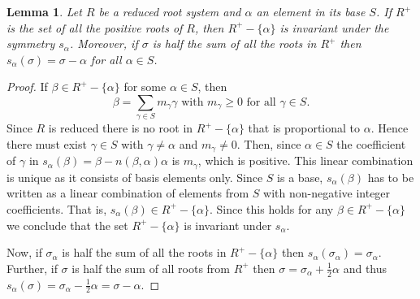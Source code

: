 \documentclass[twoside,utf8]{article}
\theoremstyle{plain}
\newtheorem{lemma}{Lemma}
\theoremstyle{definition}
\theoremstyle{remark}
\begin{document}
\begin{lemma} \label{lemma:HalfTheSum}
Let $R$ be a reduced root system and $\alpha$ an element in its base $S$. If $R^+$ is the set of all the positive roots of $R$, then $R^+-\{\alpha\}$ is invariant under the symmetry $s_\alpha$. Moreover, if $\sigma$ is half the sum of all the roots in $R^+$ then $s_\alpha(\sigma)=\sigma-\alpha$ for all $\alpha \in S$.
\end{lemma}
\begin{proof}
If $\beta \in R^+-\{\alpha\}$ for some $\alpha\in S$, then 
\[
\beta = \sum_{\gamma\in S} m_\gamma  \gamma \mbox{ with } m_\gamma \geq 0 \mbox{ for all } \gamma \in S.
\]
Since $R$ is reduced there is no root in $R^+-\{\alpha\}$ that is proportional to $\alpha$. Hence there must exist $\gamma \in S$ with $\gamma \neq \alpha$ and $m_\gamma\neq 0$. Then, since $\alpha \in S$ the coefficient of $\gamma$ in $s_\alpha(\beta)=\beta-n(\beta,\alpha)\alpha$ is $m_\gamma$, which is positive. This linear combination is unique as it consists of basis elements only. Since $S$ is a base, $s_\alpha(\beta)$ has to be written as a linear combination of elements from $S$ with non-negative integer coefficients. That is, $s_\alpha(\beta)\in R^+-\{\alpha\}$. Since this holds for any $\beta \in R^+-\{\alpha\}$ we conclude that the set $R^+-\{\alpha\}$ is invariant under $s_\alpha$.

Now, if $\sigma_\alpha$ is half the sum of all the roots in $R^+-\{\alpha\}$ then $s_{\alpha}(\sigma_\alpha)=\sigma_\alpha$. Further, if $\sigma$ is half the sum of all roots from $R^+$ then $\sigma=\sigma_\alpha+\frac{1}{2}\alpha$ and thus $s_{\alpha}(\sigma)=\sigma_\alpha-\frac{1}{2}\alpha = \sigma - \alpha$.
\end{proof}
\end{document}
